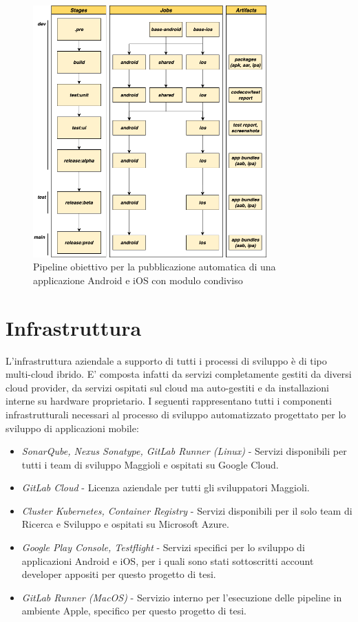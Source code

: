 \begin{figure}[H]
\centering
\includegraphics[width=0.8\textwidth]{img/tesi-11-cicd.drawio.png}
\caption{Pipeline obiettivo per la pubblicazione automatica di una applicazione Android e iOS con modulo condiviso}
\end{figure}

\section{Infrastruttura}
L'infrastruttura aziendale a supporto di tutti i processi di sviluppo è di tipo multi-cloud ibrido. E' composta infatti da servizi completamente gestiti da diversi cloud provider, da servizi ospitati sul cloud ma auto-gestiti e da installazioni interne su hardware proprietario. I seguenti rappresentano tutti i componenti infrastrutturali necessari al processo di sviluppo automatizzato progettato per lo sviluppo di applicazioni mobile:
\begin{itemize}
    \item \textit{SonarQube, Nexus Sonatype, GitLab Runner (Linux)} - Servizi disponibili per tutti i team di sviluppo Maggioli e ospitati su Google Cloud.
    \item \textit{GitLab Cloud} - Licenza aziendale per tutti gli sviluppatori Maggioli.
    \item \textit{Cluster Kubernetes, Container Registry} - Servizi disponibili per il solo team di Ricerca e Sviluppo e ospitati su Microsoft Azure.
    \item \textit{Google Play Console, Testflight} - Servizi specifici per lo sviluppo di applicazioni Android e iOS, per i quali sono stati sottoscritti account developer appositi per questo progetto di tesi.
    \item \textit{GitLab Runner (MacOS)} - Servizio interno per l'esecuzione delle pipeline in ambiente Apple, specifico per questo progetto di tesi.
\end{itemize}

